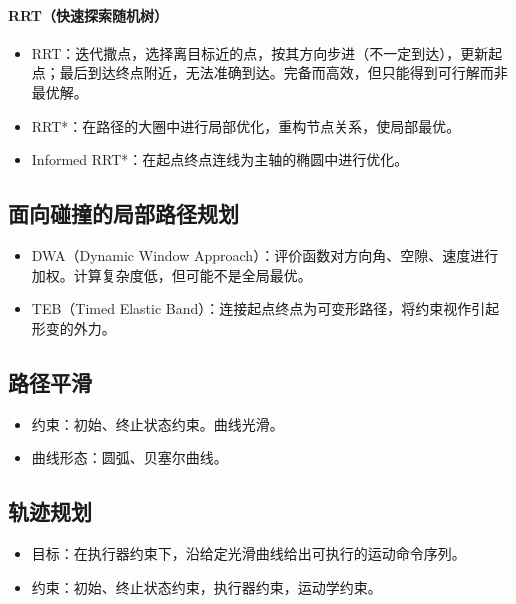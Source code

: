 \documentclass[
12pt, %
a4paper, 
oneside, %
]{scrartcl}
\begin{document}
\paragraph{RRT（快速探索随机树）}
\begin{itemize}
\item RRT：迭代撒点，选择离目标近的点，按其方向步进（不一定到达），更新起点；最后到达终点附近，无法准确到达。完备而高效，但只能得到可行解而非最优解。
\item RRT*：在路径的大圈中进行局部优化，重构节点关系，使局部最优。
\item Informed RRT*：在起点终点连线为主轴的椭圆中进行优化。
\end{itemize}
\subsection[面向碰撞的局部路径规划]{面向碰撞的局部路径规划}
\begin{itemize}
\item DWA（Dynamic Window Approach）：评价函数对方向角、空隙、速度进行加权。计算复杂度低，但可能不是全局最优。
\item TEB（Timed Elastic Band）：连接起点终点为可变形路径，将约束视作引起形变的外力。
\end{itemize}
\subsection[路径平滑]{路径平滑}
\begin{itemize}
\item 约束：初始、终止状态约束。曲线光滑。
\item 曲线形态：圆弧、贝塞尔曲线。
\end{itemize}
\subsection[轨迹规划]{轨迹规划}
\begin{itemize}
\item 目标：在执行器约束下，沿给定光滑曲线给出可执行的运动命令序列。
\item 约束：初始、终止状态约束，执行器约束，运动学约束。
\end{itemize}
\end{document}
